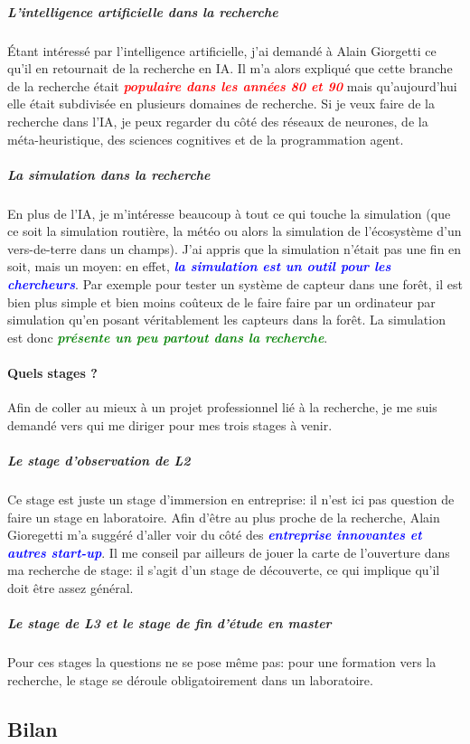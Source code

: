 \documentclass[a4paper,12pt, draft]{report}
\newcommand{\goodPoint}[1]{\textcolor{green}{\textbf{\textit{#1}}}}
\newcommand{\badPoint}[1]{\textcolor{red}{\textbf{\textit{#1}}}}
\newcommand{\importantPoint}[1]{\textcolor{blue}{\textbf{\textit{#1}}}}
\begin{document}
\subparagraph{L'intelligence artificielle dans la recherche}
Étant intéressé par l'intelligence artificielle, j'ai demandé à Alain Giorgetti ce qu'il en retournait de la recherche en IA. Il m'a alors expliqué que cette branche de la recherche était \badPoint{populaire dans les années 80 et 90} mais qu'aujourd'hui elle était subdivisée en plusieurs domaines de recherche. Si je veux faire de la recherche dans l'IA, je peux regarder du côté des réseaux de neurones, de la méta-heuristique, des sciences cognitives et de la programmation agent. 

\subparagraph{La simulation dans la recherche}
En plus de l'IA, je m'intéresse beaucoup à tout ce qui touche la simulation (que ce soit la simulation routière, la météo ou alors la simulation de l'écosystème d'un vers-de-terre dans un champs). J'ai appris que la simulation n'était pas une fin en soit, mais un moyen: en effet, \importantPoint{la simulation est un outil pour les chercheurs}. Par exemple pour tester un système de capteur dans une forêt, il est bien plus simple et bien moins coûteux de le faire faire par un ordinateur par simulation qu'en posant véritablement les capteurs dans la forêt. La simulation est donc \goodPoint{présente un peu partout dans la recherche}.

\paragraph{Quels stages ?}
Afin de coller au mieux à un projet professionnel lié à la recherche, je me suis demandé vers qui me diriger pour mes trois stages à venir.
\subparagraph{Le stage d'observation de L2}
Ce stage est juste un stage d'immersion en entreprise: il n'est ici pas question de faire un stage en laboratoire. Afin d'être au plus proche de la recherche, Alain Gioregetti m'a suggéré d'aller voir du côté des \importantPoint{entreprise innovantes et autres start-up}. Il me conseil par ailleurs de jouer la carte de l'ouverture dans ma recherche de stage: il s'agit d'un stage de découverte, ce qui implique qu'il doit être assez général.
\subparagraph{Le stage de L3 et le stage de fin d'étude en master}
Pour ces stages la questions ne se pose même pas: pour une formation vers la recherche, le stage se déroule obligatoirement dans un laboratoire.

\subsection{Bilan}
\end{document}
